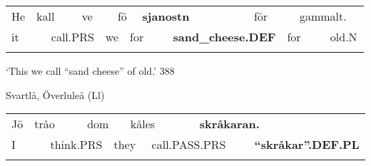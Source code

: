 \begin{tabular}{llllllllllllll}
\lsptoprule
He & \multicolumn{2}{l}{kall

} & \multicolumn{2}{l}{ve

} & \multicolumn{2}{l}{fö

} & \multicolumn{2}{l}{{\bfseries sjanostn}

} & \multicolumn{2}{l}{för

} & \multicolumn{2}{l}{gammalt.

} & \\
\multicolumn{2}{l}{it

} & \multicolumn{2}{l}{call.PRS

} & \multicolumn{2}{l}{we

} & \multicolumn{2}{l}{for

} & \multicolumn{2}{l}{{\bfseries sand\_cheese.DEF}

} & \multicolumn{2}{l}{for

} & \multicolumn{2}{l}{old.N

}\\
\lspbottomrule
\end{tabular}

\begin{styleTranslation}
‘This we call “sand cheese” of old.’ 388

\end{styleTranslation}

\begin{listWWNumileveli}
\item 

\begin{styleExample}
Svartlå, Överluleå (Ll)

\end{styleExample}

\end{listWWNumileveli}

\begin{tabular}{llllllllll}
\lsptoprule
Jö & \multicolumn{2}{l}{tråo

} & \multicolumn{2}{l}{dom

} & \multicolumn{2}{l}{kåles

} & \multicolumn{2}{l}{{\bfseries skråkaran.}

} & \\
\multicolumn{2}{l}{I

} & \multicolumn{2}{l}{think.PRS

} & \multicolumn{2}{l}{they

} & \multicolumn{2}{l}{call.PASS.PRS

} & \multicolumn{2}{l}{{\bfseries “skråkar”.DEF.PL}

}\\
\lspbottomrule
\end{tabular}

